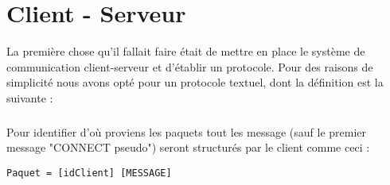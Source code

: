 \chapter{Client - Serveur}

La première chose qu'il fallait faire était de mettre en place le système de communication client-serveur et d'établir un protocole. Pour des raisons de simplicité nous avons opté pour un protocole textuel, dont la définition est la suivante :

\paragraph{}
Pour identifier d'où proviens les paquets tout les message (sauf le premier message "CONNECT pseudo") seront structurés par le client comme ceci :
\begin{verbatim}Paquet = [idClient] [MESSAGE]\end{verbatim}


